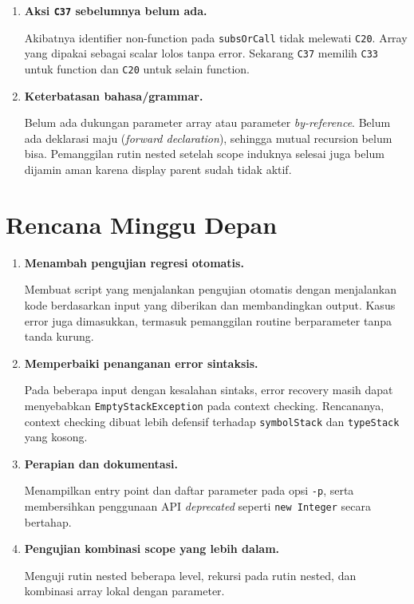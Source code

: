 \documentclass[11pt,a4paper]{article}
\begin{document}
\begin{enumerate}
  \item \textbf{Aksi \texttt{C37} sebelumnya belum ada.}

        Akibatnya identifier non-function pada \texttt{subsOrCall}
        tidak melewati \texttt{C20}. Array yang dipakai sebagai scalar
        lolos tanpa error. Sekarang \texttt{C37} memilih \texttt{C33}
        untuk function dan \texttt{C20} untuk selain function.

  \item \textbf{Keterbatasan bahasa/grammar.}

        Belum ada dukungan parameter array atau parameter
        \textit{by-reference}. Belum ada deklarasi maju
        (\textit{forward declaration}), sehingga mutual recursion
        belum bisa. Pemanggilan rutin nested setelah scope induknya
        selesai juga belum dijamin aman karena display parent sudah
        tidak aktif.
\end{enumerate}

\section{Rencana Minggu Depan}

\begin{enumerate}
  \item \textbf{Menambah pengujian regresi otomatis.}

        Membuat script yang menjalankan pengujian otomatis dengan
        menjalankan kode berdasarkan input yang diberikan dan
        membandingkan output. Kasus error juga
        dimasukkan, termasuk pemanggilan
        routine berparameter tanpa tanda kurung.

  \item \textbf{Memperbaiki penanganan error sintaksis.}

        Pada beberapa input dengan kesalahan sintaks, error recovery
        masih dapat menyebabkan \texttt{EmptyStackException} pada
        context checking. Rencananya, context checking dibuat lebih
        defensif terhadap \texttt{symbolStack} dan \texttt{typeStack}
        yang kosong.

%

  \item \textbf{Perapian dan dokumentasi.}

        Menampilkan entry point dan daftar parameter pada opsi
        \texttt{-p}, serta membersihkan penggunaan API
        \textit{deprecated} seperti \texttt{new Integer} secara
        bertahap.

  \item \textbf{Pengujian kombinasi scope yang lebih dalam.}

        Menguji rutin nested beberapa level, rekursi pada rutin
        nested, dan kombinasi array lokal dengan parameter.
\end{enumerate}
\end{document}
